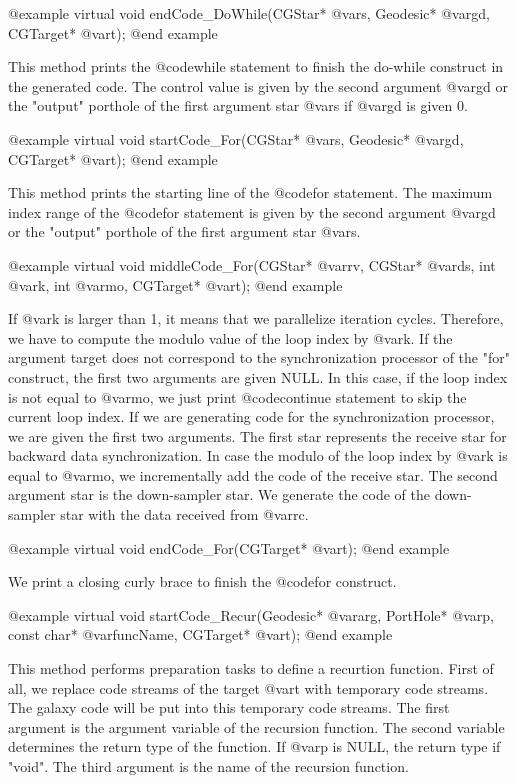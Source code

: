 {@example
virtual void endCode_DoWhile(CGStar* @var{s}, Geodesic* @var{gd}, CGTarget* @var{t});
@end example

This method prints the @code{while} statement to finish the do-while
construct in the generated code. The control value is given by the
second argument @var{gd} or the "output" porthole
of the first argument star @var{s} if @var{gd} is given 0.

@example
virtual void startCode_For(CGStar* @var{s}, Geodesic* @var{gd}, CGTarget* @var{t});
@end example

This method prints the starting line of the @code{for} statement. The
maximum index range of the @code{for} statement is given 
by the second argument
@var{gd} or the "output" porthole of the first argument star @var{s}.

@example
virtual void middleCode_For(CGStar* @var{rv}, CGStar* @var{ds}, int @var{k},
int @var{mo}, CGTarget* @var{t});
@end example

If @var{k} is larger than 1, it means that we parallelize iteration cycles.
Therefore, we have to compute the modulo value of the loop index by @var{k}.
If the argument target does not correspond to the synchronization processor
of the "for" construct, the first two arguments are given NULL. In this case,
if the loop index is not equal to @var{mo}, we just print @code{continue}
statement to skip the current loop index. If we are generating code
for the synchronization processor, we are given the first two arguments.
The first star represents the receive star for backward data synchronization.
In case the modulo of the loop index by @var{k} is equal to @var{mo},
we incrementally add the code of the receive star. The second argument star
is the down-sampler star. We generate the code of the down-sampler star with
the data received from @var{rc}.

@example
virtual void endCode_For(CGTarget* @var{t});
@end example

We print a closing curly brace to finish the @code{for} construct.

@example
virtual void startCode_Recur(Geodesic* @var{arg}, PortHole* @var{p}, const char* @var{funcName}, CGTarget* @var{t});
@end example

This method performs preparation tasks to define a recurtion function.
First of all, we replace code streams of the target @var{t} with
temporary code streams. The galaxy code will be put into this
temporary code streams. The first argument is the argument variable of the
recursion function. The second variable determines the return type of
the function. If @var{p} is NULL, the return type if "void". The third
argument is the name of the recursion function.

}
